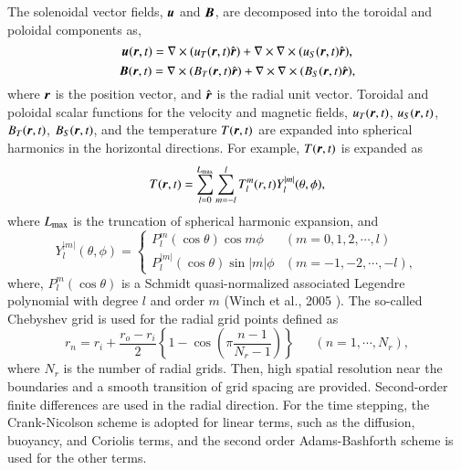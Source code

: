 %
The solenoidal vector fields, $\mbox{\boldmath$u$}$ and $\mbox{\boldmath$B$}$, are decomposed into the toroidal and poloidal components
{\color{red}
as,
%
\begin{equation}
    \mbox{\boldmath$u$} (\mbox{\boldmath$r$}, t) = \nabla \times ( u_T (\mbox{\boldmath$r$}, t) \hat{\mbox{\boldmath$r$}} ) + \nabla \times \nabla \times ( u_S (\mbox{\boldmath$r$}, t) \hat{\mbox{\boldmath$r$}} ),
\label{eq:uT_uS}
\end{equation}
%
\begin{equation}
    \mbox{\boldmath$B$} (\mbox{\boldmath$r$}, t) = \nabla \times ( B_T (\mbox{\boldmath$r$}, t) \hat{\mbox{\boldmath$r$}} ) + \nabla \times \nabla \times ( B_S (\mbox{\boldmath$r$}, t) \hat{\mbox{\boldmath$r$}} ),
\label{eq:BT_BS}
\end{equation}
where $\mbox{\boldmath$r$}$ is the position vector, and $\hat{\mbox{\boldmath$r$}}$ is the radial unit vector.
}
{\color{red}
Toroidal and poloidal scalar functions for the velocity and magnetic fields, $u_T (\mbox{\boldmath$r$}, t)$, $u_S (\mbox{\boldmath$r$}, t)$, $B_T (\mbox{\boldmath$r$}, t)$, $B_S (\mbox{\boldmath$r$}, t)$, and the temperature $T (\mbox{\boldmath$r$}, t)$
}
are expanded into spherical harmonics in the horizontal directions.
{\color{red}
For example, $T (\mbox{\boldmath$r$}, t)$ is expanded as
%
\begin{equation}
    T(\mbox{\boldmath$r$}, t) = \sum_{l=0}^{L_{\rm max}} \sum_{m=-l}^{l} T_l^m (r, t) Y_l^{|m|} (\theta, \phi),
\label{eq:T_expansion}
\end{equation}
%
where $L_{\rm max}$ is the truncation of spherical harmonic expansion, and
%
\begin{equation}
Y_l^{|m|} (\theta, \phi) = \left\{
 \begin{array}{ll}
 P_l^m(\cos\theta)\cos m\phi & (m = 0, 1, 2, \cdots, l)
 \\
 P_l^{|m|}(\cos\theta)\sin |m|\phi & (m = -1, -2, \cdots, -l) ,
 \end{array}
\right.
\label{eq:def_of_Ylm}
\end{equation}
%
where, $P_l^m (\cos \theta )$ is a Schmidt quasi-normalized associated Legendre polynomial with degree $l$ and order $m$ 
{\color{blue} (Winch et al., 2005 \cite{Winch:2005}).}
The so-called Chebyshev grid is used for the radial grid points defined as
%
\begin{equation}
r_n = r_i + \frac{r_o - r_i}{2} \left\{ 1 - \cos \left( \pi \frac{n-1}{N_r-1} \right) \right\} ~~\;\;\;\; (n = 1, \cdots , N_r) ,
\label{eq:def_of_rn}
\end{equation}
%
where $N_r$ is the number of radial grids.
Then, high spatial resolution near the boundaries and a smooth transition of grid spacing are provided.
}
Second-order finite differences are used in the radial direction.
For the time stepping, the Crank-Nicolson scheme is adopted for linear terms, such as the diffusion, buoyancy, and Coriolis terms, and the second order Adams-Bashforth scheme is used for the other terms.

